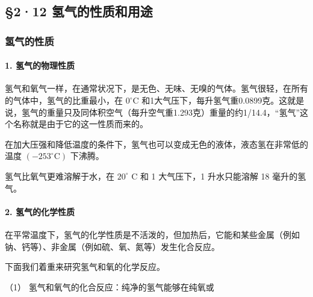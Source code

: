 \subsection{§2·12 氢气的性质和用途}

\subsubsection{氢气的性质}

\paragraph{1. 氢气的物理性质}

氢气和氧气一样，在通常状况下，是无色、无味、无嗅的气体。氢气很轻，在所有的气体中，氢气的比重最小，在
\(0^{\circ}\mathrm{C}\)
和1大气压下，每升氢气重0.0899克。这就是说，氢气的重量只及同体积空气（每升空气重1.293克）重量的约1/14.4，``氢气''这个名称就是由于它的这一性质而来的。

在加大压强和降低温度的条件下，氢气也可以变成无色的液体，液态氢在非常低的温度
\((-253^{\circ}\mathrm{C})\) 下沸腾。

氢气比氧气更难溶解于水，在 \(20^{\circ}\) C 和 1 大气压下，1
升水只能溶解 18 毫升的氢气。

\paragraph{2. 氢气的化学性质}

在平常温度下，氢气的化学性质是不活泼的，但加热后，它能和某些金属（例如钠、钙等）、非金属（例如硫、氧、氮等）发生化合反应。

下面我们着重来研究氢气和氧的化学反应。

（1） 氢气和氧气的化合反应：纯净的氢气能够在纯氧或

